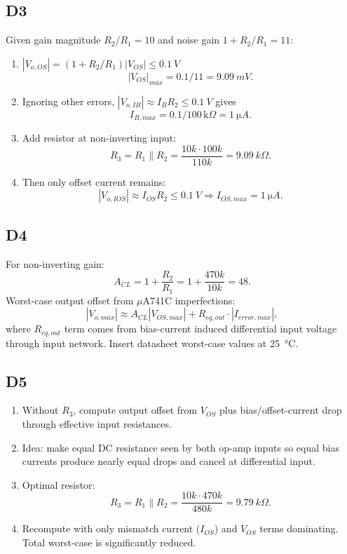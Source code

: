 \documentclass[12pt,a4paper]{article}
\begin{document}
\subsection{D3}
Given gain magnitude $R_2/R_1=10$ and noise gain $1+R_2/R_1=11$:
\begin{enumerate}[label=\alph*)]
\item $|V_{o,OS}|=(1+R_2/R_1)|V_{OS}|\le\SI{0.1}{V}$
\[
|V_{OS}|_{max}=0.1/11=\SI{9.09}{mV}.
\]
\item Ignoring other errors, $|V_{o,IB}|\approx I_B R_2\le\SI{0.1}{V}$ gives
\[
I_{B,max}=0.1/100\,\text{k}\Omega=\SI{1}{\micro A}.
\]
\item Add resistor at non-inverting input:
\[
R_3=R_1\parallel R_2=\frac{10k\cdot100k}{110k}=\SI{9.09}{k\Omega}.
\]
\item Then only offset current remains:
\[
|V_{o,IOS}|\approx I_{OS}R_2\le\SI{0.1}{V}\Rightarrow I_{OS,max}=\SI{1}{\micro A}.
\]
\end{enumerate}

\subsection{D4}
For non-inverting gain:
\[
A_{CL}=1+\frac{R_2}{R_1}=1+\frac{470k}{10k}=48.
\]
Worst-case output offset from \(\mu\)A741C imperfections:
\[
|V_{o,max}|\approx A_{CL}|V_{OS,max}| + R_{eq,out}\cdot |I_{error,max}|,
\]
where $R_{eq,out}$ term comes from bias-current induced differential input voltage through input network. Insert datasheet worst-case values at \SI{25}{\celsius}.

\subsection{D5}
\begin{enumerate}
\item Without $R_3$, compute output offset from $V_{OS}$ plus bias/offset-current drop through effective input resistances.
\item Idea: make equal DC resistance seen by both op-amp inputs so equal bias currents produce nearly equal drops and cancel at differential input.
\item Optimal resistor:
\[
R_3=R_1\parallel R_2=\frac{10k\cdot470k}{480k}=\SI{9.79}{k\Omega}.
\]
\item Recompute with only mismatch current ($I_{OS}$) and $V_{OS}$ terms dominating. Total worst-case is significantly reduced.
\end{enumerate}
\end{document}

